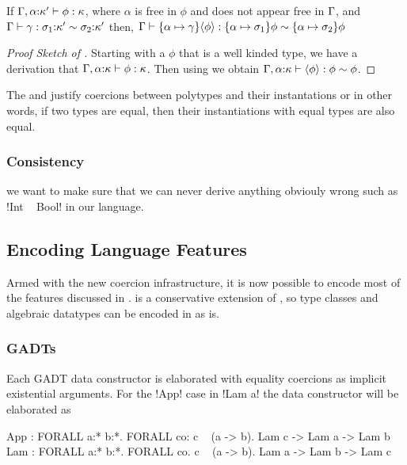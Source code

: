 \documentclass[manuscript,screen,nonacm]{acmart}
\begin{document}
\begin{theorem}\label{thm:sfc-coercion-lifting}
  If $\Gamma,\alpha{:}\kappa' \vdash \phi : \kappa$, where $\alpha$ is free in $\phi$
  and does not appear free in $\Gamma$, and
  $\Gamma \vdash \gamma : \sigma_1{:}\kappa' \sim   \sigma_2{:}\kappa'$
  then, $\Gamma \vdash \{\alpha\mapsto \gamma\}\langle\phi\rangle : \{\alpha\mapsto\sigma_1\}\phi \sim \{\alpha\mapsto\sigma_2\}\phi$
\end{theorem}
\begin{proof}[Proof Sketch of ]
  Starting with a $\phi$ that is a well kinded type, we have a derivation that $\Gamma, \alpha{:}\kappa \vdash \phi : \kappa$. Then using  we obtain $\Gamma, \alpha{:}\kappa \vdash \langle\phi\rangle : \phi \sim \phi$.
\end{proof}

The  and  justify coercions between polytypes and their instantations or in other words, if two types are equal, then their instantiations with equal types are also equal. 

\subsubsection{Consistency} we want to make sure that we can never derive anything obviouly wrong such as !Int ~ Bool! in our language.

\subsection{Encoding Language Features}

Armed with the new coercion infrastructure, it is now possible to encode most of the features discussed in . \SFC is a conservative extension of \SF, so type classes and algebraic datatypes can be encoded in \SFC as is.

\subsubsection{GADTs}
Each GADT data constructor is elaborated with equality coercions as implicit existential arguments.
For the !App! case in !Lam a! the data constructor will be elaborated as
\begin{code}
  App : FORALL a:* b:*. FORALL co: c ~ (a -> b). Lam c -> Lam a -> Lam b
  Lam : FORALL a:* b:*. FORALL co. c ~ (a -> b). Lam a -> Lam b -> Lam c
\end{code}
\end{document}
